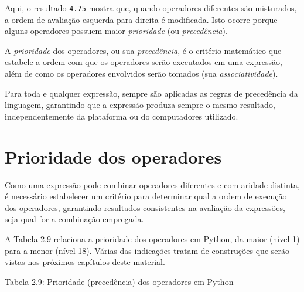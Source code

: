 \documentclass[
]{book}
\begin{document}
Aqui, o resultado \texttt{4.75} mostra que, quando operadores diferentes são misturados, a ordem de avaliação esquerda-para-direita é modificada. Isto ocorre porque alguns operadores possuem maior \emph{prioridade} (ou \emph{precedência}).

A \emph{prioridade} dos operadores, ou sua \emph{precedência}, é o critério matemático que estabele a ordem com que os operadores serão executados em uma expressão, além de como os operadores envolvidos serão tomados (sua \emph{associatividade}).

Para toda e qualquer expressão, sempre são aplicadas as regras de precedência da linguagem, garantindo que a expressão produza sempre o mesmo resultado, independentemente da plataforma ou do computadores utilizado.

\hypertarget{comput-prior}{%
\section{Prioridade dos operadores}\label{comput-prior}}

Como uma expressão pode combinar operadores diferentes e com aridade distinta, é necessário estabelecer um critério para determinar qual a ordem de execução dos operadores, garantindo resultados consistentes na avaliação da expressões, seja qual for a combinação empregada.

A Tabela 2.9 relaciona a prioridade dos operadores em Python, da maior (nível 1) para a menor (nível 18). Várias das indicações tratam de construções que serão vistas nos próximos capítulos deste material.

Tabela 2.9: Prioridade (precedência) dos operadores em Python
\end{document}
